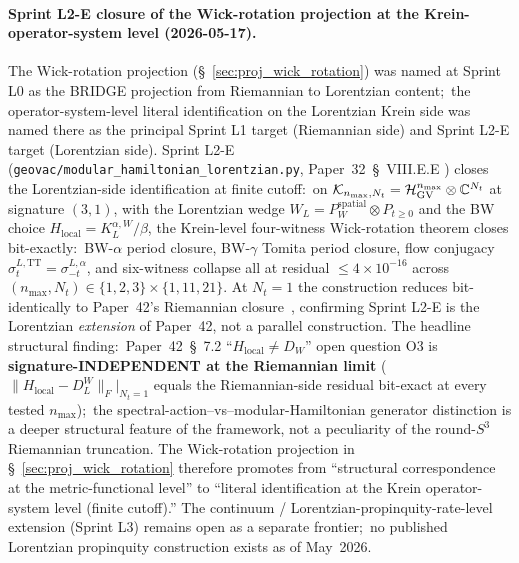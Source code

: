 \documentclass[11pt]{article}
\begin{document}
\paragraph{Sprint L2-E closure of the Wick-rotation projection at the
Krein-operator-system level (2026-05-17).}
The Wick-rotation projection (\S~\ref{sec:proj_wick_rotation}) was
named at Sprint L0 as the BRIDGE projection from Riemannian to
Lorentzian content;\ the operator-system-level literal identification
on the Lorentzian Krein side was named there as the principal Sprint L1
target (Riemannian side) and Sprint L2-E target (Lorentzian side).
Sprint L2-E (\verb|geovac/modular_hamiltonian_lorentzian.py|,
Paper~32~\S~VIII.E.E
\cite{paper32}) closes the Lorentzian-side identification at finite
cutoff:\ on $\mathcal{K}_{n_{\max}, N_t} = \mathcal{H}_{\rm GV}^{n_{\max}}
\otimes \mathbb{C}^{N_t}$ at signature $(3, 1)$, with the Lorentzian
wedge $W_L = P_W^{\mathrm{spatial}} \otimes P_{t \geq 0}$ and the
BW choice $H_{\mathrm{local}} = K_L^{\alpha, W}/\beta$, the Krein-level
four-witness Wick-rotation theorem closes bit-exactly:\ BW-$\alpha$
period closure, BW-$\gamma$ Tomita period closure, flow conjugacy
$\sigma_t^{L, \mathrm{TT}} = \sigma_{-t}^{L, \alpha}$, and six-witness
collapse all at residual $\leq 4 \times 10^{-16}$ across
$(n_{\max}, N_t) \in \{1, 2, 3\} \times \{1, 11, 21\}$.  At $N_t = 1$
the construction reduces bit-identically to Paper~42's Riemannian
closure~\cite{paper42}, confirming Sprint L2-E is the Lorentzian
\emph{extension} of Paper~42, not a parallel construction.  The
headline structural finding:\ Paper~42~\S~7.2 ``$H_{\mathrm{local}}
\neq D_W$'' open question O3 is \textbf{signature-INDEPENDENT at the
Riemannian limit} ($\|H_{\mathrm{local}} - D_L^W\|_F|_{N_t=1}$ equals
the Riemannian-side residual bit-exact at every tested $n_{\max}$);\
the spectral-action--vs--modular-Hamiltonian generator distinction is
a deeper structural feature of the framework, not a peculiarity of
the round-$S^3$ Riemannian truncation.  The Wick-rotation projection
in \S~\ref{sec:proj_wick_rotation} therefore promotes from
``structural correspondence at the metric-functional level'' to
``literal identification at the Krein operator-system level (finite
cutoff).''  The continuum / Lorentzian-propinquity-rate-level extension
(Sprint L3) remains open as a separate frontier;\ no published
Lorentzian propinquity construction exists as of May~2026.
\end{document}
